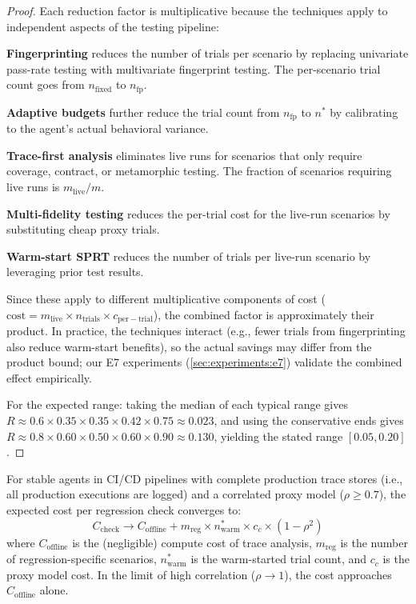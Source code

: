 \begin{proof}
Each reduction factor is multiplicative because the techniques apply to
independent aspects of the testing pipeline:

\textbf{Fingerprinting} reduces the number of trials per scenario by
replacing univariate pass-rate testing with multivariate fingerprint
testing. The per-scenario trial count goes from $n_{\mathrm{fixed}}$ to
$n_{\mathrm{fp}}$.

\textbf{Adaptive budgets} further reduce the trial count from
$n_{\mathrm{fp}}$ to $n^*$ by calibrating to the agent's actual
behavioral variance.

\textbf{Trace-first analysis} eliminates live runs for scenarios that
only require coverage, contract, or metamorphic testing. The fraction
of scenarios requiring live runs is $m_{\mathrm{live}} / m$.

\textbf{Multi-fidelity testing} reduces the per-trial cost for the
live-run scenarios by substituting cheap proxy trials.

\textbf{Warm-start SPRT} reduces the number of trials per live-run
scenario by leveraging prior test results.

Since these apply to different multiplicative components of cost
($\text{cost} = m_{\mathrm{live}} \times n_{\mathrm{trials}} \times
c_{\mathrm{per-trial}}$), the combined factor is approximately their
product. In practice, the techniques interact (e.g., fewer trials from
fingerprinting also reduce warm-start benefits), so the actual savings
may differ from the product bound; our E7 experiments
(\cref{sec:experiments:e7}) validate the combined effect empirically.

For the expected range: taking the median of each typical range gives
$R \approx 0.6 \times 0.35 \times 0.35 \times 0.42 \times 0.75
\approx 0.023$, and using the conservative ends gives
$R \approx 0.8 \times 0.60 \times 0.50 \times 0.60 \times 0.90
\approx 0.130$, yielding the stated range $[0.05, 0.20]$. \qedhere
\end{proof}

\begin{corollary}
\label{cor:cicd-cost}
For stable agents in CI/CD pipelines with complete production trace
stores (i.e., all production executions are logged) and a correlated
proxy model ($\rho \geq 0.7$), the expected cost per regression check
converges to:
\begin{equation}
\label{eq:cicd-convergence}
  C_{\mathrm{check}} \to C_{\mathrm{offline}} +
    m_{\mathrm{reg}} \times n^*_{\mathrm{warm}} \times c_c \times
    (1 - \rho^2)
\end{equation}
where $C_{\mathrm{offline}}$ is the (negligible) compute cost of
trace analysis, $m_{\mathrm{reg}}$ is the number of regression-specific
scenarios, $n^*_{\mathrm{warm}}$ is the warm-started trial count, and
$c_c$ is the proxy model cost. In the limit of high correlation
($\rho \to 1$), the cost approaches $C_{\mathrm{offline}}$ alone.
\end{corollary}

